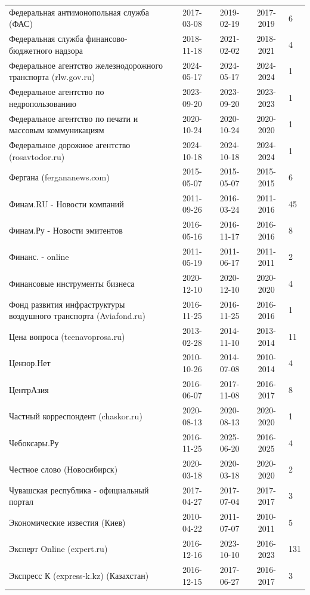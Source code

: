 \begin{longtable}{p{6cm}cccp{2cm}}
Федеральная антимонопольная служба (ФАС) & 2017-03-08 & 2019-02-19 & 2017-2019 & 6\\
Федеральная служба финансово-бюджетного надзора & 2018-11-18 & 2021-02-02 & 2018-2021 & 4\\
Федеральное агентство железнодорожного транспорта (rlw.gov.ru) & 2024-05-17 & 2024-05-17 & 2024-2024 & 1\\
Федеральное агентство по недропользованию & 2023-09-20 & 2023-09-20 & 2023-2023 & 1\\
Федеральное агентство по печати и массовым коммуникациям & 2020-10-24 & 2020-10-24 & 2020-2020 & 1\\
Федеральное дорожное агентство (rosavtodor.ru) & 2024-10-18 & 2024-10-18 & 2024-2024 & 1\\
Фергана (fergananews.com) & 2015-05-07 & 2015-05-07 & 2015-2015 & 6\\
Финам.RU - Новости компаний & 2011-09-26 & 2016-03-24 & 2011-2016 & 45\\
Финам.Ру - Новости эмитентов & 2016-05-16 & 2016-11-17 & 2016-2016 & 8\\
Финанс. - online & 2011-05-19 & 2011-06-17 & 2011-2011 & 2\\
Финансовые инструменты бизнеса & 2020-12-10 & 2020-12-10 & 2020-2020 & 4\\
Фонд развития инфраструктуры воздушного транспорта (Aviafond.ru) & 2016-11-25 & 2016-11-25 & 2016-2016 & 1\\
Цена вопроса (tcenavoprosa.ru) & 2013-02-28 & 2014-11-10 & 2013-2014 & 11\\
Цензор.Нет & 2010-10-26 & 2014-07-08 & 2010-2014 & 4\\
ЦентрАзия & 2016-06-07 & 2017-11-08 & 2016-2017 & 8\\
Частный корреспондент (chaskor.ru) & 2020-08-13 & 2020-08-13 & 2020-2020 & 1\\
Чебоксары.Ру & 2016-11-25 & 2025-06-20 & 2016-2025 & 4\\
Честное слово (Новосибирск) & 2020-03-18 & 2020-03-18 & 2020-2020 & 2\\
Чувашская республика - официальный портал & 2017-04-27 & 2017-07-04 & 2017-2017 & 3\\
Экономические известия (Киев) & 2010-04-22 & 2011-07-07 & 2010-2011 & 5\\
Эксперт Online (expert.ru) & 2016-12-16 & 2023-10-10 & 2016-2023 & 131\\
Экспресс К (express-k.kz) (Казахстан) & 2016-12-15 & 2017-06-27 & 2016-2017 & 3\\

\end{longtable}
